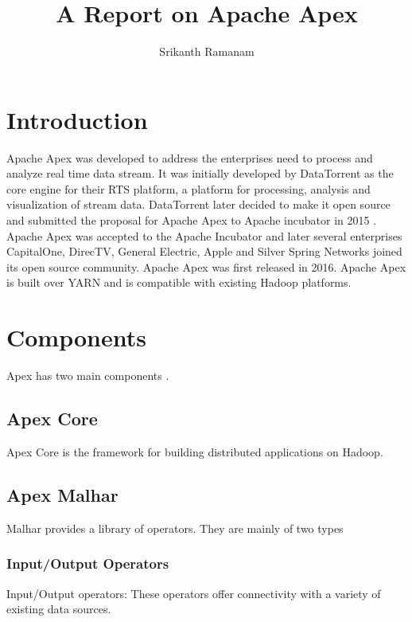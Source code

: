 \documentclass[9pt,twocolumn,twoside]{styles/osajnl}
\title{A Report on Apache Apex}
\author[1]{Srikanth Ramanam}
\affil[1]{School of Informatics and Computing, Bloomington, IN 47408, U.S.A.}
\affil[*]{Corresponding authors: srikrama@iu.edu}
\begin{document}
\maketitle

\section{Introduction}
Apache Apex was developed to address the enterprises need to process and analyze real time data stream. It was initially developed by DataTorrent as the core engine for their RTS platform, a platform for processing, analysis and visualization of stream data. DataTorrent later decided to make it open source and submitted the proposal for Apache Apex to Apache incubator in 2015 \cite{www-datatorrentapex}. Apache Apex was accepted to the Apache Incubator and later several enterprises CapitalOne, DirecTV, General Electric, Apple and Silver Spring Networks joined its open source community. Apache Apex was first released in 2016. Apache Apex is built over YARN and is compatible with existing Hadoop platforms.







\section{Components}
Apex has two main components \cite{www-apacheapexwiki}.
\subsection{Apex Core}
Apex Core is the framework for building distributed applications on Hadoop.
\subsection{Apex Malhar}
Malhar provides a library of operators. They are mainly of two types
\subsubsection{Input/Output Operators}
Input/Output operators: These operators offer connectivity with a variety of existing data sources.
\end{document}
